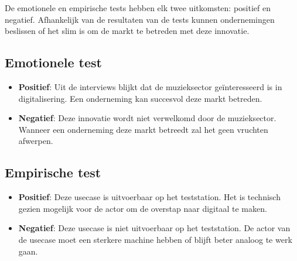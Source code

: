 De emotionele en empirische tests hebben elk twee uitkomsten: positief en negatief. Afhankelijk van de resultaten van de tests kunnen ondernemingen beslissen of het slim is om de markt te betreden met deze innovatie.

\subsection*{Emotionele test}

\begin{itemize}
    \item \textbf{Positief}: Uit de interviews blijkt dat de muzieksector geïnteresseerd is in digitalisering. Een onderneming kan succesvol deze markt betreden.
    \item \textbf{Negatief}: Deze innovatie wordt niet verwelkomd door de muzieksector. Wanneer een onderneming deze markt betreedt zal het geen vruchten afwerpen.
\end{itemize}

\subsection*{Empirische test}

\begin{itemize}
    \item \textbf{Positief}: Deze usecase is uitvoerbaar op het teststation. Het is technisch gezien mogelijk voor de actor om de overstap naar digitaal te maken.
    \item \textbf{Negatief}: Deze usecase is niet uitvoerbaar op het teststation. De actor van de usecase moet een sterkere machine hebben of blijft beter analoog te werk gaan.
\end{itemize}

\iffalse

Wat is het beoogde resultaat van je bachelorproef? Wat zijn de criteria voor succes? Beschrijf die zo concreet mogelijk. Gaat het bv. om een proof-of-concept, een prototype, een verslag met aanbevelingen, een vergelijkende studie, enz.

\fi

\section{}
\label{sec:opzet-bachelorproef}


